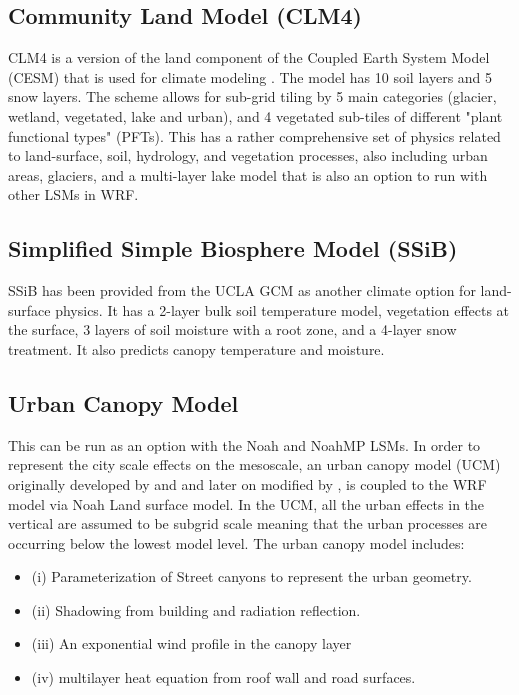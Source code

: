 \subsection{Community Land Model (CLM4)}

CLM4 is a version of the land component of the Coupled Earth System Model (CESM) that is used for climate modeling \citep{oleson10, lawrence11}. 
The model has 10 soil layers and 5 snow layers.
The scheme allows for sub-grid tiling by 5 main categories (glacier, wetland, vegetated, lake and urban), and 4 vegetated sub-tiles of different "plant functional types" (PFTs).
This has a rather comprehensive set of physics related to land-surface, soil, hydrology, and vegetation processes, also including urban areas, glaciers, and a multi-layer lake
model that is also an option to run with other LSMs in WRF.

\subsection{Simplified Simple Biosphere Model (SSiB)}

SSiB \citep{xue91, sun01} has been provided from the UCLA GCM as another climate option for land-surface physics. It has a 2-layer bulk soil temperature model,
vegetation effects at the surface, 3 layers of soil moisture with a root zone, and a 4-layer snow treatment. It also predicts canopy temperature and moisture.

\subsection{Urban Canopy Model}

This can be run as an option with the Noah and NoahMP LSMs.
In order to represent the city scale effects on the mesoscale,
an urban canopy model (UCM) originally developed by \citet{kusaka01}
and \citet{kusaka04} and later on modified
by \citet{chen06}, is coupled to the WRF model via
Noah Land surface model. In the UCM, all the urban effects in the
vertical are assumed to be subgrid scale meaning that the urban
processes are occurring below the lowest model level. The urban
canopy model includes:
\begin{itemize}\setlength{\parskip}{-4pt}
\item (i) Parameterization of Street canyons to represent the urban
geometry.
\item (ii) Shadowing from building and radiation reflection.
\item (iii) An exponential wind profile in the canopy layer
\item (iv) multilayer heat equation from roof wall and road surfaces.
\end{itemize}

